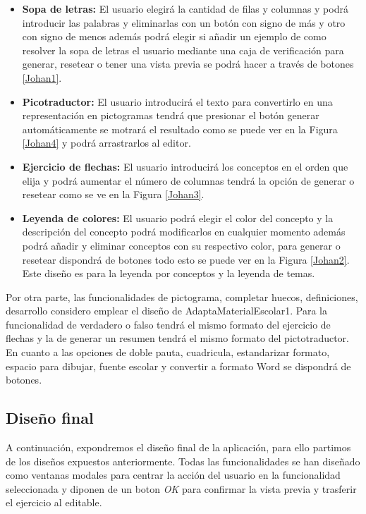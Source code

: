 \begin{itemize}
    \item \textbf{Sopa de letras:} El usuario elegirá la cantidad de filas y columnas y podrá introducir las palabras y eliminarlas con un botón con signo de más y otro con signo de menos además podrá elegir si añadir un ejemplo de como resolver la sopa de letras el usuario mediante una caja de verificación para generar, resetear o tener una vista previa se podrá hacer a través de botones \ref{Johan1}. 
    \item \textbf{Picotraductor:} El usuario introducirá el texto para convertirlo en una representación en pictogramas tendrá que presionar el botón generar automáticamente se motrará el resultado como se puede ver en la Figura \ref{Johan4} y podrá arrastrarlos al editor.
    \item \textbf{Ejercicio de flechas:} El usuario introducirá los conceptos en el orden que elija y podrá aumentar el número de columnas tendrá la opción de generar o resetear como se ve en la Figura \ref{Johan3}.
    \item  \textbf{Leyenda de colores:} El usuario podrá elegir el color del concepto y la descripción del concepto podrá modificarlos en cualquier momento además podrá añadir y eliminar conceptos con su respectivo color, para generar o resetear dispondrá de botones todo esto se puede ver en la Figura \ref{Johan2}. Este diseño es para la leyenda por conceptos y la leyenda de temas.
\end{itemize}
Por otra parte, las funcionalidades de pictograma, completar huecos, definiciones, desarrollo considero emplear el diseño de AdaptaMaterialEscolar1. Para la funcionalidad de verdadero o falso tendrá el mismo formato del ejercicio de flechas y la de generar un resumen tendrá el mismo formato del pictotraductor. En cuanto a las opciones de doble pauta, cuadricula, estandarizar formato, espacio para dibujar, fuente escolar y convertir a formato Word se dispondrá de botones.


\subsection{Diseño final}
A continuación, expondremos el diseño final de la aplicación, para ello partimos de los diseños expuestos anteriormente. Todas las funcionalidades se han diseñado como ventanas modales para centrar la acción del usuario en la funcionalidad seleccionada y diponen de un boton \textit{OK} para confirmar la vista previa y trasferir el ejercicio al editable.  
